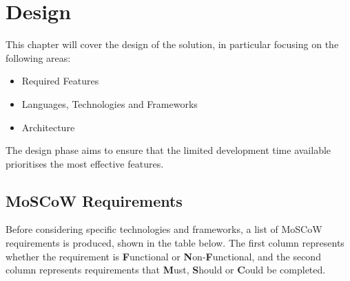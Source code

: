 \chapter{Design}\label{cha:design}
This chapter will cover the design of the solution, in particular focusing on the following areas:

\begin{itemize}
	\item Required Features
	\item Languages, Technologies and Frameworks
	\item Architecture
\end{itemize}

The design phase aims to ensure that the limited development time available prioritises the most effective features.

\section{MoSCoW Requirements}

Before considering specific technologies and frameworks, a list of MoSCoW requirements is produced, shown in the table below. The first column represents whether the requirement is \textbf{F}unctional or \textbf{N}on-\textbf{F}unctional, and the second column represents requirements that \textbf{M}ust, \textbf{S}hould or \textbf{C}ould be completed.

